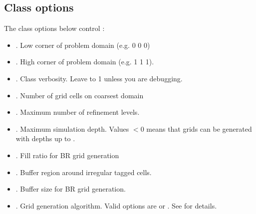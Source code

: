 \documentclass[letterpaper,10pt,english]{sphinxmanual}
\begin{document}
\subsection{Class options}
\label{\detokenize{Source/AmrMesh:class-options}}
\sphinxAtStartPar
The class options below control :
\begin{itemize}
\item {} 
\sphinxAtStartPar
{}. Low corner of problem domain (e.g. 0 0 0)

\item {} 
\sphinxAtStartPar
{}. High corner of problem domain (e.g. 1 1 1).

\item {} 
\sphinxAtStartPar
{}. Class verbosity. Leave to \sphinxhyphen{}1 unless you are debugging.

\item {} 
\sphinxAtStartPar
{}. Number of grid cells on coarsest domain

\item {} 
\sphinxAtStartPar
{}. Maximum number of refinement levels.

\item {} 
\sphinxAtStartPar
{}. Maximum simulation depth.
Values \(< 0\) means that grids can be generated with depths up to .

\item {} 
\sphinxAtStartPar
{}. Fill ratio for BR grid generation

\item {} 
\sphinxAtStartPar
{}. Buffer region around irregular tagged cells.

\item {} 
\sphinxAtStartPar
{}. Buffer size for BR grid generation.

\item {} 
\sphinxAtStartPar
{}. Grid generation algorithm. Valid options are  or . See {\hyperref[\detokenize{Source/SpatialDiscretization:chap-meshgeneration}]{}} for details.


\end{itemize}
\end{document}
